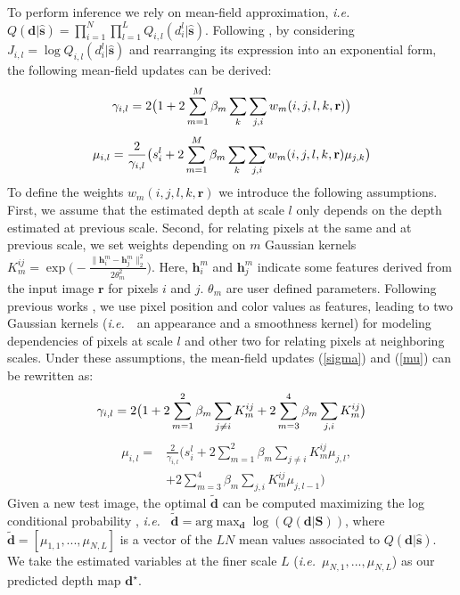 \documentclass[10pt,twocolumn,letterpaper]{article}
\newcommand{\vect}[1]{\mathbf{#1}}
\newcommand{\mr}[1]{\mathrm{#1}}
\def\ie{\textit{i.e.}~}
\begin{document}
To perform inference we rely on mean-field approximation, \ie 
$Q(\vect{d}|\hat{\mathbf{s}})=\prod_{i=1}^N\prod_{l=1}^L Q_{i,l}(d_i^l|\hat{\mathbf{s}})$. 
Following \cite{ristovski2013continuous}, by considering
$J_{i,l}=\log Q_{i,l}(d_i^l|\hat{\mathbf{s}})$ and rearranging its expression into an exponential form, the following
mean-field updates can be derived:
\begin{equation}
\setlength{\abovedisplayskip}{2pt}
\setlength{\belowdisplayskip}{2pt}
\gamma_{i,l} = 2 \big(1+2\displaystyle\sum_{m=1}^{M}\beta_m \sum_{k} \sum_{j, i} w_m(i,j,l,k,\vect{r})\big)
\label{sigma}
\end{equation}
\begin{equation}
\setlength{\abovedisplayskip}{2pt}
\setlength{\belowdisplayskip}{2pt}
\mu_{i,l} = \frac{2}{\gamma_{i,l}} \big(s_i^l + 2\sum_{m=1}^{M}\beta_m \sum_{k} \sum_{j, i} w_m(i,j,l,k,\vect{r}) \mu_{j,k} \big)
\label{mu}
\end{equation}
To define the weights $w_m(i,j,l,k,\vect{r})$ we introduce the following assumptions. First, we assume that the estimated depth at scale $l$ only
depends on the depth estimated at previous scale. Second, for relating pixels at the same and at previous scale, we set
weights depending on $m$ Gaussian kernels $K_m^{ij}=\exp\big(-\frac{\|\mathbf{h}_i^m-\mathbf{h}_j^m\|^2_2}{2\theta_m^2}\big)$. Here,
$\vect{h}_i^m$ and $\vect{h}_j^m$ indicate some features derived from the input image $\vect{r}$ for pixels $i$ and $j$. $\theta_m$ are user defined parameters. 
Following previous works \cite{koltun2011efficient}, we use pixel position 
and color values as features, leading to two Gaussian kernels (\ie~an appearance and a smoothness kernel)
for modeling dependencies of pixels at scale $l$ and other two for relating pixels at neighboring scales. 
Under these assumptions, the mean-field updates (\ref{sigma}) and (\ref{mu}) can be rewritten as:
\begin{equation}
\setlength{\abovedisplayskip}{2pt}
\setlength{\belowdisplayskip}{2pt}
\gamma_{i,l} = 2 \big(1+2 \sum_{m=1}^{2} \beta_m \sum_{j\neq i}  K_m^{ij} + 2\sum_{m=3}^{4} \beta_m 
\sum_{j, i} K_m^{ij}  \big)
\label{gamma2}
\end{equation}
\setlength{\abovedisplayskip}{2pt}
\setlength{\belowdisplayskip}{2pt}
\begin{equation}
\begin{aligned}
&\mu_{i,l} =& \frac{2}{\gamma_{i,l}} \big(s_i^l + 2\sum_{m=1}^{2}\beta_m \sum_{j \neq i} K_m^{ij} \mu_{j,l}, \\
&&+ 2\sum_{m=3}^{4} \beta_m \sum_{j, i} K_m^{ij} \mu_{j,l-1} \big) 
\end{aligned}
\label{mu2}
\end{equation}
Given a new test image, the optimal $\tilde{\vect{d}}$ can be computed
maximizing the log conditional probability \cite{ristovski2013continuous}, \ie 
$\tilde{\vect{d}} = \mr{arg}\max_{\vect{d}} \log (Q(\vect{d}|\vect{S}))$,
where $\tilde{\vect{d}} = [\mu_{1,1},...,\mu_{N,L}]$ is a vector of the $LN$ mean values associated to $Q(\vect{d}|\hat{\mathbf{s}})$.
We take the estimated variables at the finer scale $L$ (\ie $\mu_{N,1},...,\mu_{N,L}$) as our predicted depth map $\mathbf{d}^\star$. 
\vspace{-3mm}
\end{document}
